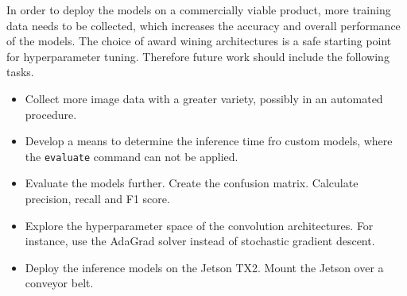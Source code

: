 \documentclass[10pt, journal, compsoc]{IEEEtran}
\begin{document}
In order to deploy the models on a commercially viable product, more training data needs to be collected, which increases the accuracy and overall performance of the models. The choice of award wining architectures is a safe starting point for hyperparameter tuning. Therefore future work should include the following tasks.
\begin{itemize}
\item Collect more image data with a greater variety, possibly in an automated procedure.
\item Develop a means to determine the inference time fro custom models, where the \texttt{evaluate} command can not be applied.
\item Evaluate the models further. Create the confusion matrix. Calculate precision, recall and F1 score.
\item Explore the hyperparameter space of the convolution architectures. For instance, use the AdaGrad solver instead of stochastic gradient descent.
\item Deploy the inference models on the Jetson TX2. Mount the Jetson over a conveyor belt.
\end{itemize}
\end{document}
